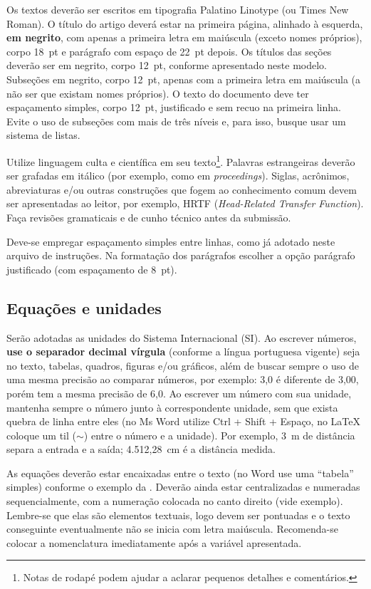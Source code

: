 Os textos deverão ser escritos em tipografia Palatino Linotype (ou Times New Roman). O título do artigo deverá estar na primeira página, alinhado à esquerda, \textbf{em negrito}, com apenas a primeira letra em maiúscula (exceto nomes próprios), corpo 18~pt e parágrafo com espaço de 22~pt depois. Os títulos das seções deverão ser em negrito, corpo 12~pt, conforme apresentado neste modelo. Subseções em negrito, corpo 12~pt, apenas com a primeira letra em maiúscula (a não ser que existam nomes próprios). O texto do documento deve ter espaçamento simples, corpo 12~pt, justificado e sem recuo na primeira linha. Evite o uso de subseções com mais de três níveis e, para isso, busque usar um sistema de listas. 

Utilize linguagem culta e científica em seu texto\footnote{Notas de rodapé podem ajudar a aclarar pequenos detalhes e comentários.}. Palavras estrangeiras deverão ser grafadas em itálico (por exemplo, como em \textit{proceedings}). Siglas, acrônimos, abreviaturas e/ou outras construções que fogem ao conhecimento comum devem ser apresentadas ao leitor, por exemplo, HRTF (\textit{Head-Related Transfer Function}).
Faça revisões gramaticais e de cunho técnico antes da submissão.

Deve-se empregar espaçamento simples entre linhas, como já adotado neste arquivo de instruções.
Na formatação dos parágrafos escolher a opção parágrafo justificado (com espaçamento de 8~pt).

\subsection{Equações e unidades}

Serão adotadas as unidades do Sistema Internacional (SI). Ao escrever números, \textbf{use o separador decimal vírgula} (conforme a língua portuguesa vigente) seja no texto, tabelas, quadros, figuras e/ou gráficos, além de buscar sempre o uso de uma mesma precisão ao comparar números, por exemplo: 3,0 é diferente de 3,00, porém tem a mesma precisão de 6,0. Ao escrever um número com sua unidade, mantenha sempre o número junto à correspondente unidade, sem que exista quebra de linha entre eles (no Ms Word utilize Ctrl + Shift + Espaço, no \LaTeX\xspace coloque um til ($\sim$) entre o número e a unidade). Por exemplo, 3~m de distância separa a entrada e a saída; 4.512,28~cm é a distância medida.

As equações deverão estar encaixadas entre o texto (no Word use uma ``tabela'' simples) conforme o exemplo da . Deverão ainda estar centralizadas e numeradas sequencialmente, com a numeração colocada no canto direito (vide exemplo). Lembre-se que elas são elementos textuais, logo devem ser pontuadas e o texto conseguinte eventualmente não se inicia com letra maiúscula. Recomenda-se colocar a nomenclatura imediatamente após a variável apresentada.

